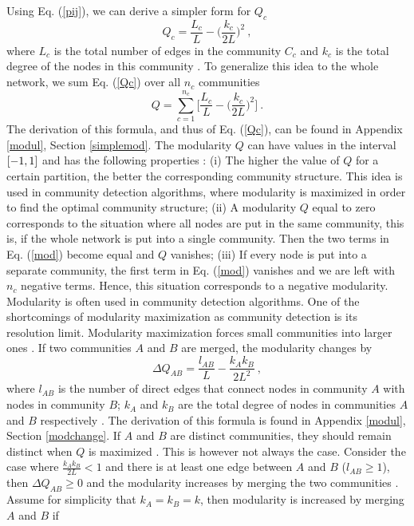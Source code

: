 \documentclass[11 pt , letterpaper , twoside , openright]{book}
\begin{document}
\newline
Using Eq. (\ref{pij}), we can derive a simpler form for $Q_c$
\begin{equation}\label{Qc}
	Q_c = \frac{L_c}{L} - \bigg(\frac{k_c}{2L}\bigg)^2 \ ,
\end{equation}
where $L_c$ is the total number of edges in the community $C_c$ and $k_c$ is the total degree of the nodes in this community \cite{Albert2016}. To generalize this idea to the whole network, we sum Eq. (\ref{Qc}) over all $n_c$ communities \cite{Albert2016}
\begin{equation}\label{mod}
	Q = \sum_{c = 1}^{n_c}\bigg[\frac{L_c}{L} - \bigg(\frac{k_c}{2L}\bigg)^2 \bigg] \ .
\end{equation}
The derivation of this formula, and thus of Eq. (\ref{Qc}), can be found in Appendix \ref{modul}, Section \ref{simplemod}. The modularity $Q$ can have values in the interval $\interval{-1}{1}$ and has the following properties \cite{Albert2016}: (i) The higher the value of $Q$ for a certain partition, the better the corresponding community structure. This idea is used in community detection algorithms, where modularity is maximized in order to find the optimal community structure; (ii) A modularity $Q$ equal to zero corresponds to the situation where all nodes are put in the same community, this is, if the whole network is put into a single community. Then the two terms in Eq. (\ref{mod}) become equal and $Q$ vanishes; (iii) If every node is put into a separate community, the first term in Eq. (\ref{mod}) vanishes and we are left with $n_c$ negative terms. Hence, this situation corresponds to a negative modularity.\\
\newline
Modularity is often used in community detection algorithms. One of the shortcomings of modularity maximization as community detection is its resolution limit. Modularity maximization forces small communities into larger ones \cite{Albert2016}. If two communities $A$ and $B$ are merged, the modularity changes by
\begin{equation}
	\Delta Q_{AB} = \frac{l_{AB}}{L} - \frac{k_Ak_B}{2L^2} \ ,
\end{equation}
where $l_{AB}$ is the number of direct edges that connect nodes in community $A$ with nodes in community $B$; $k_A$ and $k_B$ are the total degree of nodes in communities $A$ and $B$ respectively \cite{Albert2016}. The derivation of this formula is found in Appendix \ref{modul}, Section \ref{modchange}. If $A$ and $B$ are distinct communities, they should remain distinct when $Q$ is maximized \cite{Albert2016}. This is however not always the case. Consider the case where $\frac{k_Ak_B}{2L} < 1$ and there is at least one edge between $A$ and $B$ ($l_{AB} \geqslant 1$), then $\Delta Q_{AB} \geqslant 0$ and the modularity increases by merging the two communities \cite{Albert2016}. Assume for simplicity that $k_A = k_B = k$, then modularity is increased by merging $A$ and $B$ if
\end{document}

